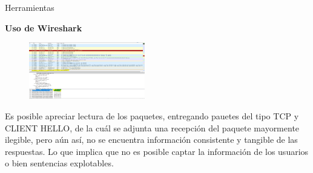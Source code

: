 \begin{frame}[t,fragile]{Herramientas}

\textbf{Uso de Wireshark}

\begin{figure} 
\vspace{2pt}
  \begin{center}
    \includegraphics[width=0.45\textwidth]{paquetelectura.png}
    \label{fig:databaseUserTable}
  \end{center}
  \vspace{2pt}
\end{figure} 

\bigskip

Es posible apreciar lectura de los paquetes, entregando pauetes del tipo TCP y CLIENT HELLO, de la cuál se adjunta una recepción del paquete mayormente ilegible, pero aún así, no se encuentra información consistente y tangible de las respuestas. Lo que implica que no es posible captar la información de los usuarios o bien sentencias explotables.


\end{frame}

